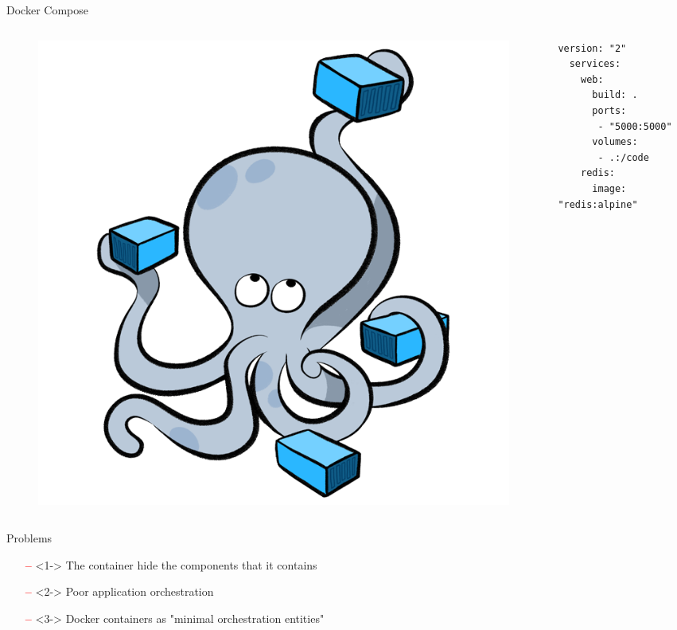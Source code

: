 \documentclass{beamer}
\begin{document}
  \begin{frame}[fragile]{Docker Compose}
    \begin{columns}[c]
      \begin{column}{.4\textwidth}
        \begin{figure}
          \includegraphics[width=1\textwidth]{img/docker_compose.png}
        \end{figure}
      \end{column}
      \begin{column}{.6\textwidth}
      \begin{lstlisting}[basicstyle=\ttfamily,keywordstyle=\color{red}]
  version: "2"
  services:
    web:
      build: .
      ports:
       - "5000:5000"
      volumes:
       - .:/code
    redis:
      image: "redis:alpine"
      \end{lstlisting}
      \end{column}
    \end{columns}
  \end{frame}

  \begin{frame}{Problems}
    \begin{itemize}
      \item[\textcolor{red}{\textbf{--}}]<1-> The container hide the components that it contains
      \item[\textcolor{red}{\textbf{--}}]<2-> Poor application orchestration
      \item[\textcolor{red}{\textbf{--}}]<3->
      Docker containers as "minimal orchestration entities"
    \end{itemize}
  \end{frame}
\end{document}

